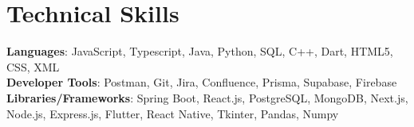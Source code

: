 \documentclass[letterpaper,11pt]{article}
\begin{document}
\section{Technical Skills}
 \begin{itemize}[leftmargin=0.15in, label={}]
    \small{\item{   
     \textbf{Languages}{: JavaScript, Typescript, Java, Python, SQL, C++, Dart, HTML5, CSS, XML} \\[1mm]
     \textbf{Developer Tools}{: Postman, Git, Jira, Confluence, Prisma, Supabase, Firebase} \\[1mm]
     \textbf{Libraries/Frameworks}{: Spring Boot, React.js, PostgreSQL, MongoDB, Next.js, Node.js, Express.js, Flutter, React Native, Tkinter, Pandas, Numpy} \\ [1mm]
    }}
 \end{itemize}
 \vspace{-16pt}
 \vspace{3pt}
\vspace{10pt}

\vspace{-15pt}
\end{document}

